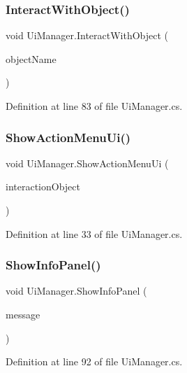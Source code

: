 \subsubsection{\texorpdfstring{InteractWithObject()}{InteractWithObject()}}
{\footnotesize\ttfamily void Ui\+Manager.\+Interact\+With\+Object (\begin{DoxyParamCaption}\item[{string}]{object\+Name }\end{DoxyParamCaption})}



Definition at line 83 of file Ui\+Manager.\+cs.

\mbox{\label{class_ui_manager_aad8d3c4e5861408df38ba876342b7462}} 
\subsubsection{\texorpdfstring{ShowActionMenuUi()}{ShowActionMenuUi()}}
{\footnotesize\ttfamily void Ui\+Manager.\+Show\+Action\+Menu\+Ui (\begin{DoxyParamCaption}\item[{\mbox{\hyperlink{class_interaction_object}{Interaction\+Object}}}]{interaction\+Object }\end{DoxyParamCaption})}



Definition at line 33 of file Ui\+Manager.\+cs.

\mbox{\label{class_ui_manager_a258d350817ef4c325ac86d93f3bc12d8}} 
\subsubsection{\texorpdfstring{ShowInfoPanel()}{ShowInfoPanel()}}
{\footnotesize\ttfamily void Ui\+Manager.\+Show\+Info\+Panel (\begin{DoxyParamCaption}\item[{string}]{message }\end{DoxyParamCaption})}



Definition at line 92 of file Ui\+Manager.\+cs.

\mbox{\label{class_ui_manager_a7e7d498b91dafeec3e17f437f8b21476}} 
